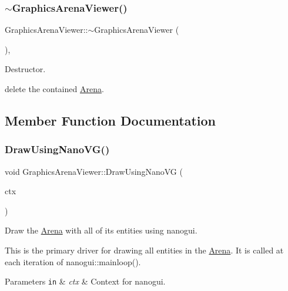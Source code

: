 \subsubsection{\texorpdfstring{$\sim$\+Graphics\+Arena\+Viewer()}{~GraphicsArenaViewer()}}
{\footnotesize\ttfamily Graphics\+Arena\+Viewer\+::$\sim$\+Graphics\+Arena\+Viewer (\begin{DoxyParamCaption}{ }\end{DoxyParamCaption})\hspace{0.3cm}{\ttfamily [inline]}, {\ttfamily [override]}}



Destructor. 

{\ttfamily delete} the contained \mbox{\hyperlink{class_arena}{Arena}}. 

\subsection{Member Function Documentation}
\mbox{\label{class_graphics_arena_viewer_a7d59755e3f7674f382127fe135492eeb}} 
\subsubsection{\texorpdfstring{Draw\+Using\+Nano\+V\+G()}{DrawUsingNanoVG()}}
{\footnotesize\ttfamily void Graphics\+Arena\+Viewer\+::\+Draw\+Using\+Nano\+VG (\begin{DoxyParamCaption}\item[{N\+V\+Gcontext $\ast$}]{ctx }\end{DoxyParamCaption})\hspace{0.3cm}{\ttfamily [override]}}



Draw the \mbox{\hyperlink{class_arena}{Arena}} with all of its entities using {\ttfamily nanogui}. 

This is the primary driver for drawing all entities in the \mbox{\hyperlink{class_arena}{Arena}}. It is called at each iteration of {\ttfamily nanogui\+::mainloop()}.


\begin{DoxyParams}[1]{Parameters}
\mbox{\tt in}  & {\em ctx} & Context for nanogui. \\
\hline
\end{DoxyParams}
\mbox{\label{class_graphics_arena_viewer_ab0001d4a3ebde2b1f5b4cb7770824726}} 
